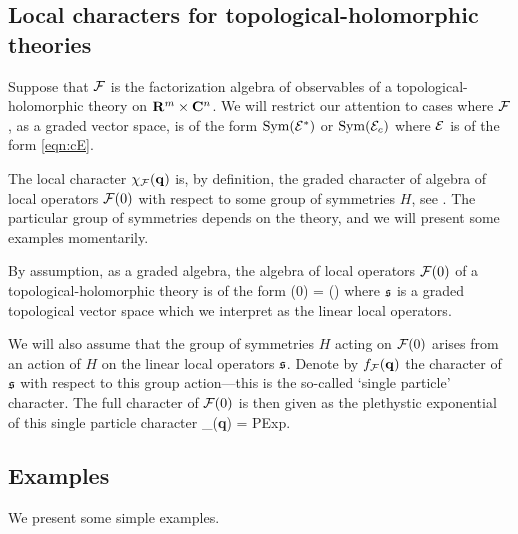 \subsection{Local characters for topological-holomorphic theories}\label{s:localchar}

Suppose that $\mathcal F$ is the factorization algebra of observables of a topological-holomorphic theory on $\mathbf{R}^m \times \mathbf{C}^n$. 
We will restrict our attention to cases where $\mathcal F$, as a graded vector space, is of the form $\operatorname{Sym}(\mathcal E^*)$ or $\operatorname{Sym}(\mathcal E_c)$ where $\mathcal E$ is of the form \eqref{eqn:cE}.

The local character $\chi_\mathcal F ({\bf q})$ is, by definition, the graded character of algebra of local operators $\mathcal F(0)$ with respect to some group of symmetries $H$, see \cite{SWchar}.
The particular group of symmetries depends on the theory, and we will present some examples momentarily. 

By assumption, as a graded algebra, the algebra of local operators $\mathcal F(0)$ of a topological-holomorphic theory is of the form
\beqn
\cF(0) = \Sym ()
\eeqn
where $\mathfrak{s}$ is a graded topological vector space which we interpret as the linear local operators.

We will also assume that the group of symmetries $H$ acting on $\mathcal F(0)$ arises from an action of $H$ on the linear local operators $\mathfrak{s}$. 
Denote by $f_{\mathcal F}({\bf q})$ the character of $\mathfrak{s}$ with respect to this group action---this is the so-called `single particle' character. 
The full character of $\mathcal F(0)$ is then given as the plethystic exponential of this single particle character
\beqn
\chi_{\cF}({\bf q}) = {\rm PExp}\left[f_{\cF}({\bf q}) \right] .
\eeqn

\subsection{Examples}

We present some simple examples. 

